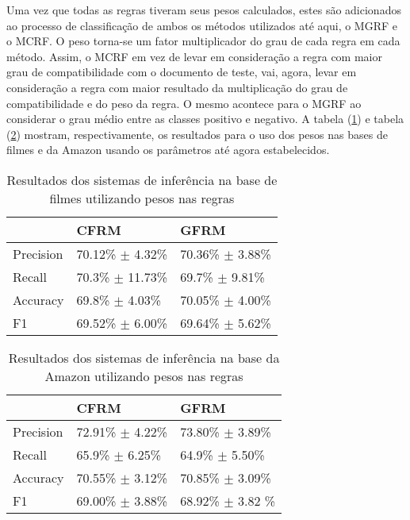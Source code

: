 Uma vez que todas as regras tiveram seus pesos calculados, estes são adicionados ao processo de classificação de ambos os métodos utilizados até aqui, o MGRF e o MCRF. O peso torna-se um fator multiplicador do grau de cada regra em cada método. Assim, o MCRF em vez de levar em consideração a regra com maior grau de compatibilidade com o documento de teste, vai, agora, levar em consideração a regra com maior resultado da multiplicação do grau de compatibilidade e do peso da regra. O mesmo acontece para o MGRF ao considerar o grau médio entre as classes positivo e negativo. A tabela (\ref{table:movies2_pesos}) e tabela (\ref{table:amazon2_pesos}) mostram, respectivamente, os resultados para o uso dos pesos nas bases de filmes e da Amazon usando os parâmetros até agora estabelecidos. 

\begin{table}[!h]
    \begin{tabular}{lll}
 	~         			& CFRM 								& GFRM \\ \hline
    Precision 		& 70.12\% $\pm$ 4.32\%   & 70.36\% $\pm$ 3.88\%    \\
    Recall    		& 70.3\% $\pm$ 11.73\%   & 69.7\% $\pm$ 9.81\%   \\
    Accuracy  		& 69.8\% $\pm$ 4.03\%    	& 70.05\% $\pm$ 4.00\%    \\
    F1  					& 69.52\% $\pm$ 6.00\% & 69.64\% $\pm$ 5.62\%    \\
    \end{tabular}
    \caption{Resultados dos sistemas de inferência na base de filmes utilizando pesos nas regras}
	\label{table:movies2_pesos}
\end{table}

\begin{table}[!h]
    \begin{tabular}{lll}
    ~         			& CFRM 									& GFRM \\ \hline
    Precision 		& 72.91\% $\pm$ 4.22\%    	& 73.80\% $\pm$ 3.89\%    \\
    Recall    		& 65.9\% $\pm$ 6.25\%    		& 64.9\% $\pm$ 5.50\%    \\
    Accuracy  		& 70.55\% $\pm$ 3.12\%    	& 70.85\% $\pm$ 3.09\%   \\
    F1  					& 69.00\% $\pm$ 3.88\%   		& 68.92\% $\pm$ 3.82	\%   \\
    \end{tabular}
    \caption{Resultados dos sistemas de inferência na base da Amazon utilizando pesos nas regras}
	\label{table:amazon2_pesos}
\end{table}

